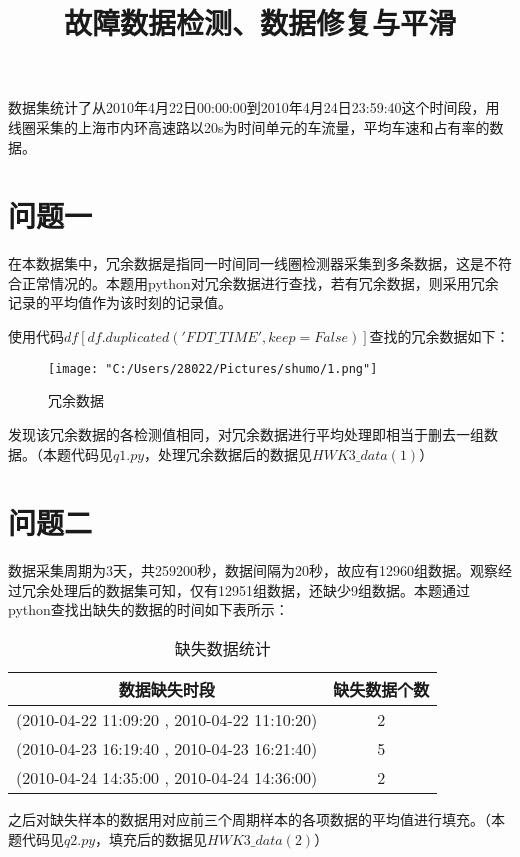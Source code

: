 \documentclass[withoutpreface,bwprint]{cumcmthesis} %
\title{故障数据检测、数据修复与平滑}
\begin{document}
 \maketitle
 数据集统计了从2010年4月22日00:00:00到2010年4月24日23:59:40这个时间段，用线圈采集的上海市内环高速路以20s为时间单元的车流量，平均车速和占有率的数据。

\section{问题一}
在本数据集中，冗余数据是指同一时间同一线圈检测器采集到多条数据，这是不符合正常情况的。本题用python对冗余数据进行查找，若有冗余数据，则采用冗余记录的平均值作为该时刻的记录值。\par
使用代码$df[df.duplicated('FDT\_TIME',keep=False)]$查找的冗余数据如下：\par
\begin{figure}[!htbp] 
    \centering
    \texttt{[image: "C:/Users/28022/Pictures/shumo/1.png"]}
    \caption{冗余数据}
    \label{fig:your_label}
\end{figure}
发现该冗余数据的各检测值相同，对冗余数据进行平均处理即相当于删去一组数据。（本题代码见$q1.py$，处理冗余数据后的数据见$HWK3\_data(1)$）

\section{问题二}
数据采集周期为3天，共259200秒，数据间隔为20秒，故应有12960组数据。观察经过冗余处理后的数据集可知，仅有12951组数据，还缺少9组数据。本题通过python查找出缺失的数据的时间如下表所示：\par
\begin{table}[!htbp]
    \centering
    \caption{缺失数据统计}
    \begin{tabular}{cc} 
        \toprule[1.5pt]
        数据缺失时段 & 缺失数据个数 \\ 
        \midrule 
        (2010-04-22 11:09:20 , 2010-04-22 11:10:20) & 2 \\
        (2010-04-23 16:19:40 , 2010-04-23 16:21:40) & 5 \\
        (2010-04-24 14:35:00 , 2010-04-24 14:36:00) & 2 \\
        \bottomrule[1.5pt]
    \end{tabular}
\end{table}\par
之后对缺失样本的数据用对应前三个周期样本的各项数据的平均值进行填充。（本题代码见$q2.py$，填充后的数据见$HWK3\_data(2)$）
\end{document}
